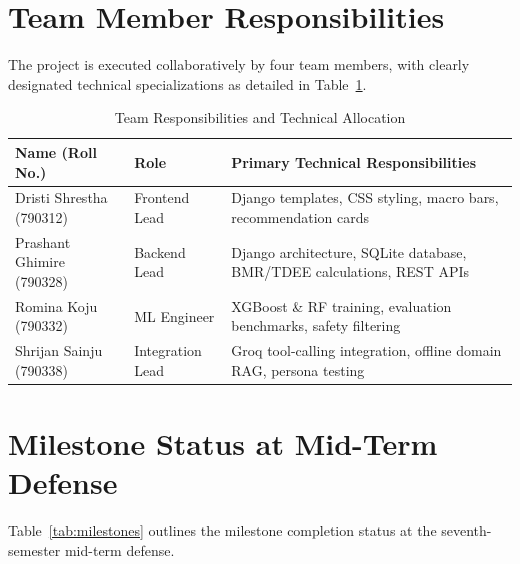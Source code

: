 \documentclass[12pt,a4paper]{report}
\begin{document}
\section{Team Member Responsibilities}

The project is executed collaboratively by four team members, with clearly designated technical specializations as detailed in Table~\ref{tab:team}.

\begin{table}[htbp]
\centering
\caption{Team Responsibilities and Technical Allocation}
\label{tab:team}
\begin{tabular}{lll}
\toprule
\textbf{Name (Roll No.)} & \textbf{Role} & \textbf{Primary Technical Responsibilities} \\
\midrule
Dristi Shrestha (790312)  & Frontend Lead    & Django templates, CSS styling, macro bars, recommendation cards \\
Prashant Ghimire (790328) & Backend Lead     & Django architecture, SQLite database, BMR/TDEE calculations, REST APIs \\
Romina Koju (790332)      & ML Engineer      & XGBoost \& RF training, evaluation benchmarks, safety filtering \\
Shrijan Sainju (790338)   & Integration Lead & Groq tool-calling integration, offline domain RAG, persona testing \\
\bottomrule
\end{tabular}
\end{table}

\section{Milestone Status at Mid-Term Defense}

Table~\ref{tab:milestones} outlines the milestone completion status at the seventh-semester mid-term defense.
\end{document}
